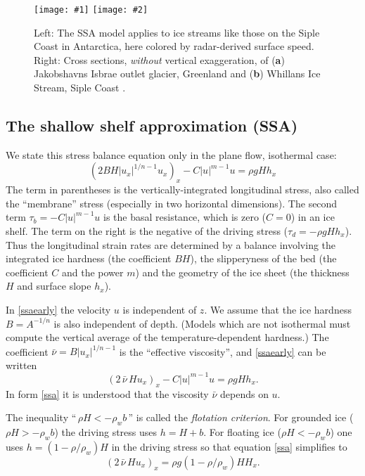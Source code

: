 \documentclass[letterpaper,final,12pt,reqno]{amsart}
\newcommand{\twofigsizes}[5]{
\begin{figure}[ht]
\centering
\texttt{[image: \#1]} \quad
\texttt{[image: \#2]}
\caption{#3}
\label{fig:#1}
\end{figure}}
\begin{document}
\twofigsizes{siple}{streamisbrae}{Left:  The SSA model applies to ice streams like those on the Siple Coast in Antarctica, here colored by radar-derived surface speed.  Right: Cross sections, \emph{without} vertical exaggeration, of (\textbf{a}) Jakobshavns Isbrae outlet glacier, Greenland and (\textbf{b}) Whillans Ice Stream, Siple Coast \cite{TrufferEchelmeyer}.}{2.8in}{2.9in}

\subsection*{The shallow shelf approximation (SSA)}  We state this stress balance equation only in the plane flow, isothermal case:
\begin{equation}
  \left(2 B H |u_x|^{1/n - 1} u_x\right)_x - C|u|^{m-1}u = \rho g H h_x \label{ssaearly}
\end{equation}
The term in parentheses is the vertically-integrated longitudinal stress, also called the ``membrane'' stress (especially in two horizontal dimensions).  The second term $\tau_b = - C|u|^{m-1}u$ is the basal resistance, which is zero ($C=0$) in an ice shelf.  The term on the right is the negative of the driving stress ($\tau_d = - \rho g H h_x$).  Thus the longitudinal strain rates are determined by a balance involving the integrated ice hardness (the coefficient $BH$), the slipperyness of the bed (the coefficient $C$ and the power $m$) and the geometry of the ice sheet (the thickness $H$ and surface slope $h_x$).

In \eqref{ssaearly} the velocity $u$ is independent of $z$.  We assume that the ice hardness $B=A^{-1/n}$ is also independent of depth.  (Models which are not isothermal must compute the vertical average of the temperature-dependent hardness.)  The coefficient $\bar \nu = B |u_x|^{1/n-1}$ is the ``effective viscosity'', and \eqref{ssaearly} can be written
\begin{equation}
  \left(2 \,\bar \nu\, H u_x\right)_x - C |u|^{m-1} u = \rho g H h_x.  \label{ssa}
\end{equation}
In form \eqref{ssa} it is understood that the viscosity $\bar\nu$ depends on $u$.

The inequality ``$\,\rho H < - \rho_w b\,$'' is called the \emph{flotation criterion}.  For grounded ice ($\rho H > - \rho_w b$) the driving stress uses $h = H+b$.  For floating ice ($\rho H < - \rho_w b$) one uses $h = (1-\rho/\rho_w) H$ in the driving stress so that equation \eqref{ssa} simplifies to
\begin{equation}
   \left(2 \,\bar\nu\, H u_x\right)_x = \rho g (1-\rho/\rho_w) H H_x. \label{ssafloat}
\end{equation}
\end{document}
